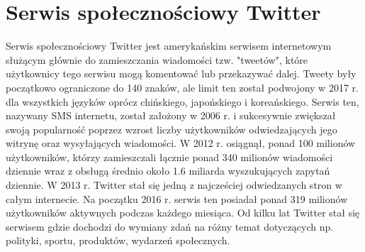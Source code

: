 \chapter{Serwis społecznościowy Twitter}
Serwis spo\l{}eczno\'sciowy Twitter jest ameryka\'nskim serwisem internetowym s\l{}u\.z\k{a}cym g\l{}\'ownie do zamieszczania wiadomo\'sci tzw. "tweet\'ow", kt\'ore u\.zytkownicy tego serwisu mog\k{a} komentowa\'c lub przekazywa\'c dalej. Tweety by\l{}y pocz\k{a}tkowo ograniczone do 140 znak\'ow, ale limit ten zosta\l{} podwojony w 2017 r. dla wszystkich j\k{e}zyk\'ow opr\'ocz chi\'nskiego, japo\'nskiego i korea\'nskiego. Serwis ten, nazywany SMS internetu, zosta\l{} za\l{}o\.zony w 2006 r. i sukcesywnie zwi\k{e}ksza\l{} swoj\k{a} popularno\'s\'c poprzez wzrost liczby u\.zytkownik\'ow odwiedzaj\k{a}cych jego witryn\k{e} oraz wysy\l{}aj\k{a}cych wiadomo\'sci. W 2012 r. osiągnął‚ ponad 100 milionów użytkowników, którzy zamieszczali łącznie ponad 340 milionów wiadomo\'sci dziennie wraz z obsługą \'srednio około 1.6 miliarda wyszukujących zapytań dziennie. W 2013 r. Twitter stał si\k{e} jedną z najcze\'sciej odwiedzanych stron w całym internecie. Na początku 2016 r. serwis ten posiadał ponad 319 milionów użytkowników aktywnych podczas każdego miesiąca. Od kilku lat Twitter stał si\k{e} serwisem gdzie dochodzi do wymiany zdań na różny temat dotyczących np. polityki, sportu, produktów, wydarzeń społecznych.